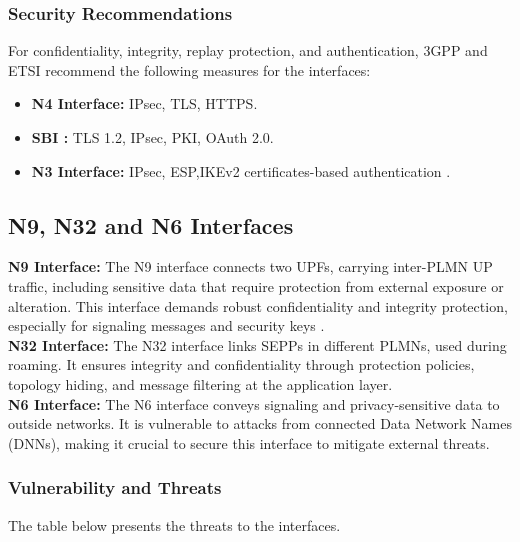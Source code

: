 \documentclass{report}
\begin{document}
\subsubsection{Security Recommendations}
    For confidentiality, integrity, replay protection, and authentication, 3GPP and ETSI recommend the following measures for the interfaces:
    \begin{itemize}
        \item \textbf{N4 Interface:} IPsec, TLS, HTTPS.
        \item \textbf{SBI :} TLS 1.2, IPsec, PKI, OAuth 2.0.
        \item \textbf{N3 Interface: } IPsec, ESP,IKEv2 certificates-based authentication \cite{mahyoub2024security}.
    \end{itemize}
    
\subsection{N9, N32 and N6 Interfaces}
    \noindent\textbf{N9 Interface: } The N9 interface connects two UPFs, carrying inter-PLMN UP traffic, including sensitive data that require protection from external exposure or alteration. This interface demands robust confidentiality and integrity protection, especially for signaling messages and security keys \cite{mahyoub2024security}.\\
    
    \noindent\textbf{N32 Interface: } The N32 interface links SEPPs in different PLMNs, used during roaming. It ensures integrity and confidentiality through protection policies, topology hiding, and message filtering at the application layer\cite{mahyoub2024security}.\\
    
    \noindent\textbf{N6 Interface:} The N6 interface conveys signaling and privacy-sensitive data to outside networks. It is vulnerable to attacks from connected Data Network Names (DNNs), making it crucial to secure this interface to mitigate external threats.
    

\subsubsection{Vulnerability and Threats}
    The table below presents the threats to the interfaces.
    
\end{document}

